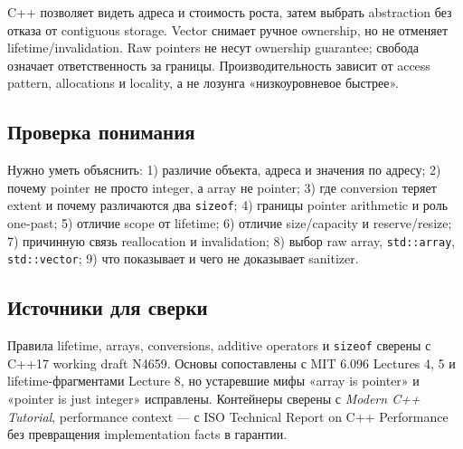 C++ позволяет видеть адреса и стоимость роста, затем выбрать abstraction без
отказа от contiguous storage. Vector снимает ручное ownership, но не отменяет
lifetime/invalidation. Raw pointers не несут ownership guarantee; свобода
означает ответственность за границы. Производительность зависит от access
pattern, allocations и locality, а не лозунга «низкоуровневое быстрее».

\subsection{Проверка понимания}

Нужно уметь объяснить:
1) различие объекта, адреса и значения по адресу; 2) почему pointer не просто integer, а array не pointer; 3) где conversion теряет extent и почему различаются два \texttt{sizeof}; 4) границы pointer arithmetic и роль one-past; 5) отличие scope от lifetime; 6) отличие size/capacity и reserve/resize; 7) причинную связь reallocation и invalidation; 8) выбор raw array, \texttt{std::array}, \texttt{std::vector}; 9) что показывает и чего не доказывает sanitizer.

\subsection{Источники для сверки}

Правила lifetime, arrays, conversions, additive operators и \texttt{sizeof}
сверены с C++17 working draft N4659. Основы сопоставлены с MIT 6.096 Lectures
4, 5 и lifetime-фрагментами Lecture 8, но устаревшие мифы «array is pointer» и
«pointer is just integer» исправлены. Контейнеры сверены с
\textit{Modern C++ Tutorial}, performance context --- с ISO Technical Report
on C++ Performance без превращения implementation facts в гарантии.
